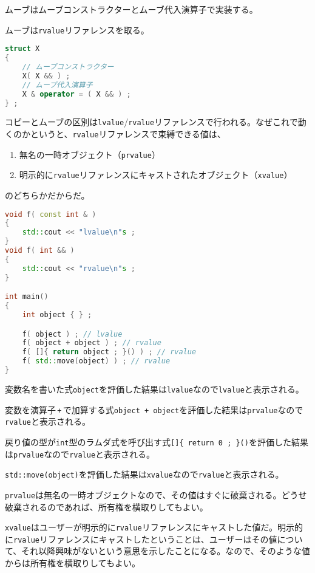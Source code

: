 ムーブはムーブコンストラクターとムーブ代入演算子で実装する。

ムーブは\texttt{rvalue}リファレンスを取る。

\begin{lstlisting}[language={C++}]
struct X
{
    // ムーブコンストラクター
    X( X && ) ;
    // ムーブ代入演算子
    X & operator = ( X && ) ;
} ;
\end{lstlisting}

コピーとムーブの区別は\texttt{lvalue}/\texttt{rvalue}リファレンスで行われる。なぜこれで動くのかというと、\texttt{rvalue}リファレンスで束縛できる値は、
\ifTombow\pagebreak\fi
\begin{enumerate}
\def\labelenumi{\arabic{enumi}.}
\item
  無名の一時オブジェクト（\texttt{prvalue}）
\item
  明示的に\texttt{rvalue}リファレンスにキャストされたオブジェクト（\texttt{xvalue}）
\end{enumerate}
のどちらかだからだ。

\begin{lstlisting}[language={C++}]
void f( const int & ) 
{
    std::cout << "lvalue\n"s ;
}
void f( int && )
{
    std::cout << "rvalue\n"s ;
}

int main()
{
    int object { } ;

    f( object ) ; // lvalue
    f( object + object ) ; // rvalue
    f( []{ return object ; }() ) ; // rvalue
    f( std::move(object) ) ; // rvalue
}
\end{lstlisting}

変数名を書いた式\texttt{object}を評価した結果は\texttt{lvalue}なので\texttt{lvalue}と表示される。

変数を演算子\,\texttt{+}\,で加算する式\texttt{object + object}を評価した結果は\texttt{prvalue}なので\texttt{rvalue}と表示される。

戻り値の型が\texttt{int}型のラムダ式を呼び出す式\texttt{[]\{ return 0 ; \}()}を評価した結果は\texttt{prvalue}なので\texttt{rvalue}と表示される。

\texttt{std::move(object)}を評価した結果は\texttt{xvalue}なので\texttt{rvalue}と表示される。

\texttt{prvalue}は無名の一時オブジェクトなので、その値はすぐに破棄される。どうせ破棄されるのであれば、所有権を横取りしてもよい。

\texttt{xvalue}はユーザーが明示的に\texttt{rvalue}リファレンスにキャストした値だ。明示的に\texttt{rvalue}リファレンスにキャストしたということは、ユーザーはその値について、それ以降興味がないという意思を示したことになる。なので、そのような値からは所有権を横取りしてもよい。

